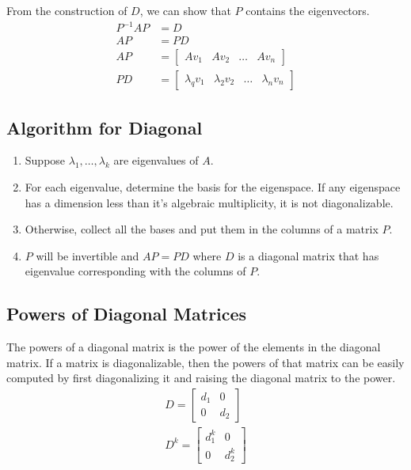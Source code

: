 \documentclass{article}
\theoremstyle{mytheoremstyle}
\theoremstyle{mytheoremstyle}
\theoremstyle{myproblemstyle}
\begin{document}
    From the construction of $D$, we can show that $P$ contains the
    eigenvectors.
    \begin{align*}
        P^{-1}AP &= D \\
        AP &= PD \\
        AP &= \begin{bmatrix}
            Av_1 & Av_2 & \dots & Av_n
        \end{bmatrix} \\
        PD &= \begin{bmatrix}
            \lambda_q v_1 & \lambda_2 v_2 & \dots & \lambda_n v_n
        \end{bmatrix}
    \end{align*}

    \subsection*{Algorithm for Diagonal}
    \begin{enumerate}
        \item Suppose $\lambda_1,\dots,\lambda_k$ are eigenvalues of $A$.
        \item For each eigenvalue, determine the basis for the eigenspace. If
            any eigenspace has a dimension less than it's algebraic
            multiplicity, it is not diagonalizable.
        \item Otherwise, collect all the bases and put them in the columns of a
            matrix $P$.
        \item $P$ will be invertible and $AP=PD$ where $D$ is a diagonal matrix
            that has eigenvalue corresponding with the columns of $P$.
    \end{enumerate}

    \subsection*{Powers of Diagonal Matrices}
    The powers of a diagonal matrix is the power of the elements in the diagonal
    matrix. If a matrix is diagonalizable, then the powers of that matrix can be
    easily computed by first diagonalizing it and raising the diagonal matrix to
    the power.
    \begin{align*}
        D = \begin{bmatrix}
            d_1 & 0 \\
            0 & d_2
        \end{bmatrix} \\
        D^k = \begin{bmatrix}
            d_1^k & 0 \\
            0 & d_2^k
        \end{bmatrix}
    \end{align*}
\end{document}
